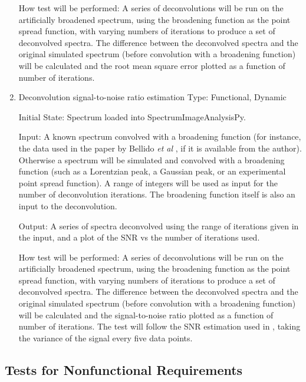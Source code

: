 \documentclass[12pt, titlepage]{article}
\newcommand{\progname}{SpectrumImageAnalysisPy}
\begin{document}
\begin{enumerate}
How test will be performed: A series of deconvolutions will be run on the artificially broadened spectrum, using the broadening function as the point spread function, with varying numbers of iterations to produce a set of deconvolved spectra. The difference between the deconvolved spectra and the original simulated spectrum (before convolution with a broadening function) will be calculated and the root mean square error plotted as a function of number of iterations.\\


\item{Deconvolution signal-to-noise ratio estimation}
\label{TFR:RLSNR}
Type: Functional, Dynamic
					
Initial State: Spectrum loaded into \progname{}.

Input: A known spectrum convolved with a broadening function (for instance, the data used in the paper by Bellido \textit{et al} \cite{bellido_toward_2014}, if it is available from the author). Otherwise a spectrum will be simulated and convolved with a broadening function (such as a Lorentzian peak, a Gaussian peak, or an experimental point spread function). A range of integers will be used as input for the number of deconvolution iterations. The broadening function itself is also an input to the deconvolution.

Output: A series of spectra deconvolved using the range of iterations given in the input, and a plot of the SNR vs the number of iterations used.
					
How test will be performed: A series of deconvolutions will be run on the artificially broadened spectrum, using the broadening function as the point spread function, with varying numbers of iterations to produce a set of deconvolved spectra. The difference between the deconvolved spectra and the original simulated spectrum (before convolution with a broadening function) will be calculated and the signal-to-noise ratio plotted as a function of number of iterations. The test will follow the SNR estimation used in \cite{bellido_toward_2014}, taking the variance of the signal every five data points.\\

\end{enumerate}

\subsection{Tests for Nonfunctional Requirements}
\label{subsec:NonfuncReqTest}
\end{document}

